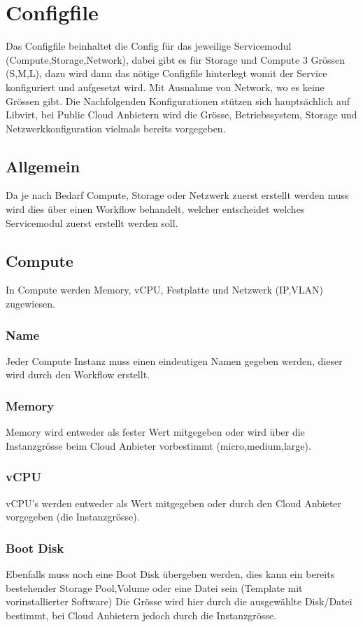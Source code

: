 
\section{Configfile}
Das Configfile beinhaltet die Config für das jeweilige Servicemodul 
(Compute,Storage,Network), dabei gibt es für Storage und Compute 3 Grössen 
(S,M,L), dazu wird dann das nötige Configfile hinterlegt womit der Service 
konfiguriert und aufgesetzt wird.
Mit Ausnahme von Network, wo es keine Grössen gibt.
Die Nachfolgenden Konfigurationen stützen sich hauptsächlich auf Libvirt, bei 
Public Cloud Anbietern wird die Grösse, Betriebssystem, Storage und Netzwerkkonfiguration 
vielmals bereits vorgegeben.

\subsection{Allgemein}
Da je nach Bedarf Compute, Storage oder Netzwerk zuerst erstellt werden muss 
wird dies über einen Workflow behandelt, welcher entscheidet welches
Servicemodul zuerst erstellt werden soll.

\subsection{Compute}
In Compute werden Memory, vCPU, Festplatte und Netzwerk (IP,VLAN) zugewiesen.

\subsubsection{Name}
Jeder Compute Instanz muss einen eindeutigen Namen gegeben werden, dieser wird 
durch den Workflow erstellt.

\subsubsection{Memory}
Memory wird entweder als fester Wert mitgegeben oder wird über die Instanzgrösse 
beim Cloud Anbieter vorbestimmt (micro,medium,large).

\subsubsection{vCPU}
vCPU's werden entweder als Wert mitgegeben oder durch den Cloud Anbieter vorgegeben (die Instanzgrösse). 

\subsubsection{Boot Disk}
Ebenfalls muss noch eine Boot Disk übergeben werden, dies kann ein bereits 
bestehender Storage Pool,Volume oder eine Datei sein (Template mit vorinstallierter Software)
Die Grösse wird hier durch die ausgewählte Disk/Datei bestimmt, bei Cloud 
Anbietern jedoch durch die Instanzgrösse.

